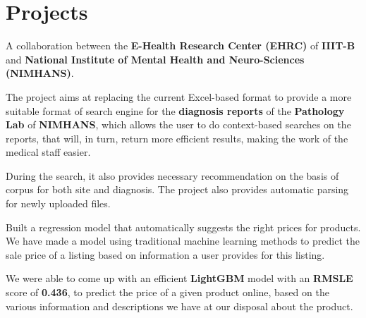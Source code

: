 \documentclass[]{deedy-resume-openfont}
\begin{document}
\hfill
\begin{minipage}[t]{0.66\textwidth} 


\section{Projects}

\vspace{\topsep} %
\begin{tightemize}
\item A collaboration between the \textbf{E-Health Research Center (EHRC)} of \textbf{IIIT-B} and  \textbf{National Institute of Mental Health and Neuro-Sciences (NIMHANS)}. 
\item The project aims at replacing the current Excel-based format to provide a more suitable format of search engine for the \textbf{diagnosis reports} of the \textbf{Pathology Lab} of \textbf{NIMHANS}, which allows the user to do context-based searches on the reports, that will, in turn, return more efficient results, making the work of the medical staff easier.
\item During the search, it also provides necessary recommendation on the basis of corpus for both site and diagnosis. The project also provides automatic parsing for newly uploaded files. 
\end{tightemize}
\sectionsep

\begin{tightemize}
\item Built a regression model that automatically suggests the right prices for products. We have made a model using traditional machine learning methods to predict the sale price of a listing based on information a user provides for this listing.
\item We  were  able  to  come up  with  an  efficient \textbf{LightGBM} model  with an  \textbf{RMSLE} score of \textbf{0.436}, to predict the price of a given product online, based on the various information and descriptions we have at our disposal about the product.
\end{tightemize}
\sectionsep


\end{minipage}
\end{document}
